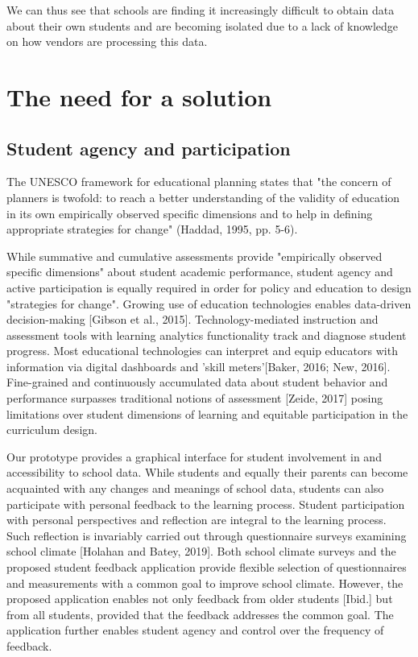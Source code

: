 \documentclass{article}
\begin{document}
We can thus see that schools are finding it increasingly difficult to obtain data about their own students and are becoming isolated due to a lack of knowledge on how vendors are processing this data.

\section{The need for a solution}

\subsection{Student agency and participation}
The UNESCO framework for educational planning states that "the concern of planners is twofold: to reach a better understanding of the validity of education in its own empirically observed specific dimensions and to help in defining appropriate strategies for change" (Haddad, 1995, pp. 5-6).

While summative and cumulative assessments provide "empirically observed specific dimensions" about student academic performance, student agency and active participation is equally required in order for policy and education to design "strategies for change". Growing use of education technologies enables data-driven decision-making [Gibson et al., 2015]. Technology-mediated instruction and assessment tools with learning analytics functionality track and diagnose student progress. Most educational technologies can interpret and equip educators with information via digital dashboards and 'skill meters'[Baker, 2016; New, 2016]. Fine-grained and continuously accumulated data about student behavior and performance surpasses traditional notions of assessment [Zeide, 2017] posing limitations over student dimensions of learning and equitable participation in the curriculum design.

Our prototype provides a graphical interface for student involvement in and accessibility to school data. While students and equally their parents can become acquainted with any changes and meanings of school data, students can also participate with personal feedback to the learning process. Student participation with personal perspectives and reflection are integral to the learning process. Such reflection is invariably carried out through questionnaire surveys examining school climate [Holahan and Batey, 2019]. Both school climate surveys and the proposed student feedback application provide flexible selection of questionnaires and measurements with a common goal to improve school climate. However, the proposed application enables not only feedback from older students [Ibid.] but from all students, provided that the feedback addresses the common goal. The application further enables student agency and control over the frequency of feedback.
\end{document}
